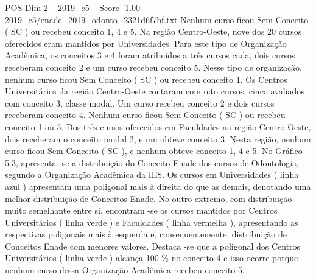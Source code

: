 \begin{textsample}{POS Dim 2 – 2019\_c5 – Score -1.00 – 2019\_c5/enade\_2019\_odonto\_2321d6f7bf.txt}
Nenhum curso ficou Sem Conceito ( SC ) ou recebeu conceito 1, 4 e 5.
Na região Centro-Oeste, nove dos 20 cursos oferecidos eram mantidos por Universidades.
Para este tipo de Organização Acadêmica, os conceitos 3 e 4 foram atribuídos a três cursos cada, dois cursos receberam conceito 2 e um curso recebeu conceito 5.
Nesse tipo de organização, nenhum curso ficou Sem Conceito ( SC ) ou recebeu conceito 1.
Os Centros Universitários da região Centro-Oeste contaram com oito cursos, cinco avaliados com conceito 3, classe modal.
Um curso recebeu conceito 2 e dois cursos receberam conceito 4.
Nenhum curso ficou Sem Conceito ( SC ) ou recebeu conceito 1 ou 5.
Dos três cursos oferecidos em Faculdades na região Centro-Oeste, dois receberam o conceito modal 2, e um obteve conceito 3.
Nesta região, nenhum curso ficou Sem Conceito ( SC ), e nenhum obteve conceito 1, 4 e 5.
No Gráfico 5.3, apresenta -se a distribuição do Conceito Enade dos cursos de Odontologia, segundo a Organização Acadêmica da IES.
Os cursos em Universidades ( linha azul ) apresentam uma poligonal mais à direita do que as demais, denotando uma melhor distribuição de Conceitos Enade.
No outro extremo, com distribuição muito semelhante entre si, encontram -se os cursos mantidos por Centros Universitários ( linha verde ) e Faculdades ( linha vermelha ), apresentando as respectivas poligonais mais à esquerda e, consequentemente, distribuição de Conceitos Enade com menores valores.
Destaca -se que a poligonal dos Centros Universitários ( linha verde ) alcança 100 \% no conceito 4 e isso ocorre porque nenhum curso dessa Organização Acadêmica recebeu conceito 5.

\end{textsample}
